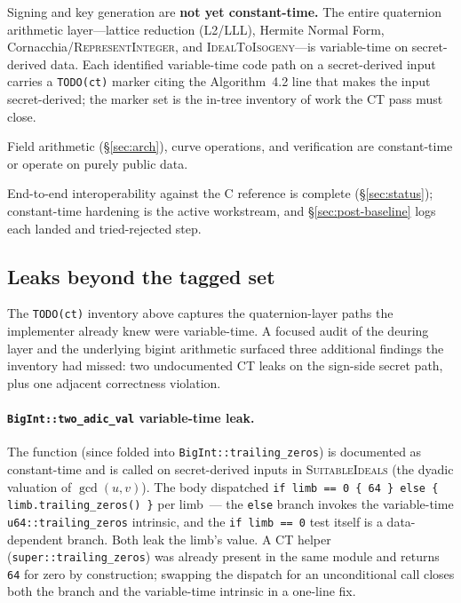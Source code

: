 Signing and key generation are \textbf{not yet constant-time.}  The
entire quaternion arithmetic layer---lattice reduction (L2/LLL), Hermite
Normal Form, Cornacchia/\textsc{RepresentInteger}, and
\textsc{IdealToIsogeny}---is variable-time on secret-derived data.
Each identified variable-time code path on a secret-derived input
carries a \texttt{TODO(ct)} marker citing the Algorithm~4.2 line that
makes the input secret-derived; the marker set is the in-tree
inventory of work the CT pass must close.

Field arithmetic (\S\ref{sec:arch}), curve operations, and
verification are constant-time or operate on purely public data.

End-to-end interoperability against the C reference is complete
(\S\ref{sec:status}); constant-time hardening is the active
workstream, and \S\ref{sec:post-baseline} logs each landed and
tried-rejected step.

\subsection{Leaks beyond the tagged set}

The \texttt{TODO(ct)} inventory above captures the quaternion-layer
paths the implementer already knew were variable-time.  A focused
audit of the deuring layer and the underlying bigint arithmetic
surfaced three additional findings the inventory had missed: two
undocumented CT leaks on the sign-side secret path, plus one
adjacent correctness violation.

\paragraph{\texttt{BigInt::two\_adic\_val} variable-time leak.}
The function (since folded into \texttt{BigInt::trailing\_zeros}) is
documented as constant-time and is called on
secret-derived inputs in \textsc{SuitableIdeals} (the dyadic
valuation of $\gcd(u, v)$).  The body dispatched
\texttt{if limb == 0 \{ 64 \} else \{ limb.trailing\_zeros() \}}
per limb~--- the \texttt{else} branch invokes the variable-time
\texttt{u64::trailing\_zeros} intrinsic, and the
\texttt{if limb == 0} test itself is a data-dependent branch.
Both leak the limb's value.  A CT helper
(\texttt{super::trailing\_zeros}) was already present in the same
module and returns \texttt{64} for zero by construction; swapping
the dispatch for an unconditional call closes both the branch and
the variable-time intrinsic in a one-line fix.

